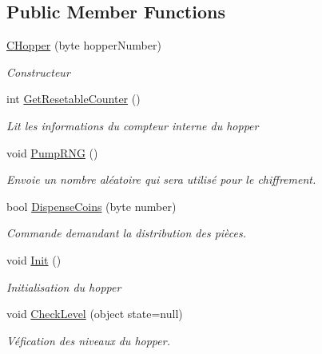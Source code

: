 \subsection*{Public Member Functions}
\begin{DoxyCompactItemize}
\item 
\mbox{\hyperlink{class_device_library_1_1_c_hopper_a25c0ba824eb783ecdec6c6f53f90f243}{C\+Hopper}} (byte hopper\+Number)
\begin{DoxyCompactList}\small\item\em Constructeur \end{DoxyCompactList}\item 
int \mbox{\hyperlink{class_device_library_1_1_c_hopper_a6c3cbf56cd236d0867a96e5345f6b881}{Get\+Resetable\+Counter}} ()
\begin{DoxyCompactList}\small\item\em Lit les informations du compteur interne du hopper \end{DoxyCompactList}\item 
void \mbox{\hyperlink{class_device_library_1_1_c_hopper_ad4e3e04686c9cabd002597ebd8fa3712}{Pump\+R\+NG}} ()
\begin{DoxyCompactList}\small\item\em Envoie un nombre aléatoire qui sera utilisé pour le chiffrement. \end{DoxyCompactList}\item 
bool \mbox{\hyperlink{class_device_library_1_1_c_hopper_adc0fd478490e3ef5e255f7bc2f64f506}{Dispense\+Coins}} (byte number)
\begin{DoxyCompactList}\small\item\em Commande demandant la distribution des pièces. \end{DoxyCompactList}\item 
void \mbox{\hyperlink{class_device_library_1_1_c_hopper_aa47c51849127934ffa8b0fd19a46344a}{Init}} ()
\begin{DoxyCompactList}\small\item\em Initialisation du hopper \end{DoxyCompactList}\item 
void \mbox{\hyperlink{class_device_library_1_1_c_hopper_aa46a9adf83ee5e25c9d6c6f3e315501a}{Check\+Level}} (object state=null)
\begin{DoxyCompactList}\small\item\em Véfication des niveaux du hopper. \end{DoxyCompactList}\item 

\end{DoxyCompactItemize}
